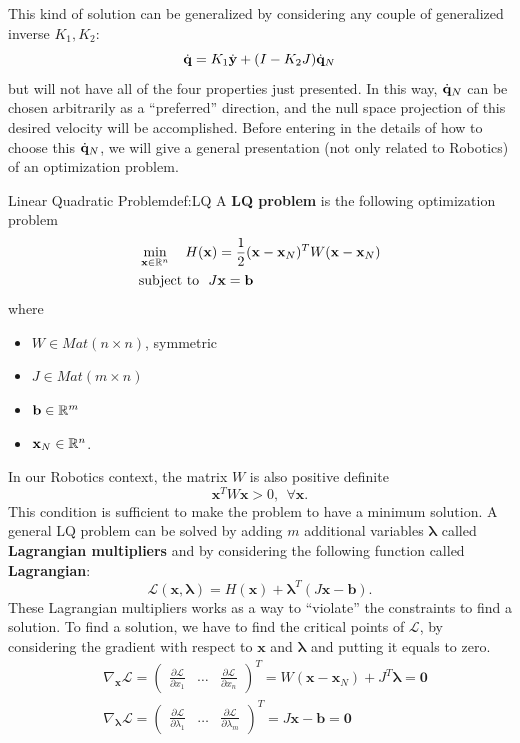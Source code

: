 \documentclass[10pt, a4paper]{report}
\begin{document}
This kind of solution can be generalized by considering any couple of generalized inverse $K_1,K_2$:\begin{equation}
    {\dot{\mathbf q}}=K_1{\dot{\mathbf y}}+(I-K_2J){\dot{\mathbf q}}_N 
\end{equation}
but will not have all of the four properties just presented. In this way, ${\dot{\mathbf q}}_N$ can be chosen arbitrarily as a ``preferred'' direction, and the null space projection of this desired velocity will be accomplished. Before entering in the details of how to choose this ${\dot{\mathbf q}}_N$, we will give a general presentation (not only related to Robotics) of an optimization problem.
\begin{boxdefinition}{Linear Quadratic Problem}{def:LQ}
    A \textbf{LQ problem} is the following optimization problem\begin{align}
        &\min_{\mathbf x\in {\mathbb R}^n}\quad H(\mathbf x)=\frac{1}{2}(\mathbf x-\mathbf x_N)^TW(\mathbf x-\mathbf x_N)\\
        &\text{subject to } \ J\mathbf x=\mathbf b 
    \end{align}
    where\begin{itemize}
        \item $W\in Mat(n\times n)$, symmetric
        \item $J\in Mat(m\times n)$
        \item $\mathbf b\in {\mathbb R}^m$
        \item $\mathbf x_N\in {\mathbb R}^n$.
    \end{itemize}
\end{boxdefinition}
\noindent In our Robotics context, the matrix $W$ is also positive definite\begin{equation}
    \mathbf x^T W \mathbf x >0, \ \ \forall \mathbf x.
\end{equation}
This condition is sufficient to make the problem to have a minimum solution. A general LQ problem can be solved by adding $m$ additional variables $\boldsymbol{\lambda}$ called \textbf{Lagrangian multipliers} and by considering the following function called \textbf{Lagrangian}:\begin{equation}
    \mathcal L(\mathbf x,\boldsymbol{\lambda})=H(\mathbf x)+\boldsymbol{\lambda}^T(J\mathbf x-\mathbf b).
\end{equation}
These Lagrangian multipliers works as a way to ``violate'' the constraints to find a solution. To find a solution, we have to find the critical points of $\mathcal L$, by considering the gradient with respect to $\mathbf x$ and $\boldsymbol{\lambda}$ and putting it equals to zero.\begin{align}
    &\nabla_{\mathbf x}\mathcal L=\begin{pmatrix}
        \frac{\partial\mathcal L}{\partial x_1}&\dots & \frac{\partial\mathcal L}{\partial x_n}
    \end{pmatrix}^T=W(\mathbf x-\mathbf x_N)+J^T\boldsymbol{\lambda}=\mathbf 0\\ 
    &\nabla_{\boldsymbol{\lambda}}\mathcal L=\begin{pmatrix}
        \frac{\partial\mathcal L}{\partial \lambda_1}&\dots & \frac{\partial\mathcal L}{\partial \lambda_m}
    \end{pmatrix}^T=J\mathbf x-\mathbf b=\mathbf 0
\end{align}
\end{document}
